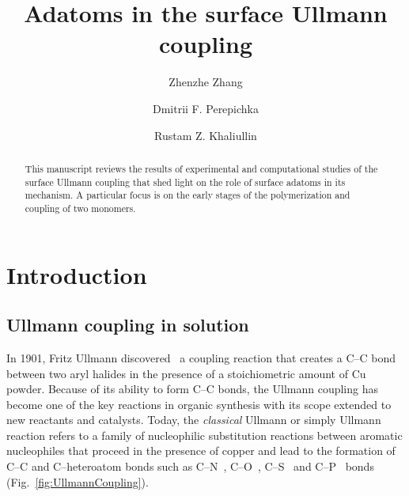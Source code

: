 \documentclass[%
 reprint,
 amsmath,amssymb,
 aps,
prb,
]{revtex4-2}
\begin{document}

\title{Adatoms in the surface Ullmann coupling}%

\author{Zhenzhe Zhang}
\author{Dmitrii F. Perepichka}%
\author{Rustam Z. Khaliullin}
%


\begin{abstract}
This manuscript reviews the results of experimental and computational studies of the surface Ullmann coupling that shed light on the role of surface adatoms in its mechanism. A particular focus is on the early stages of the polymerization and coupling of two monomers.
\end{abstract}

\maketitle


\section{Introduction}

\subsection{Ullmann coupling in solution}

In 1901, Fritz Ullmann discovered~\cite{ullmann_01} a coupling reaction that creates a C--C bond between two aryl halides in the presence of a stoichiometric amount of Cu powder. 
Because of its ability to form C--C bonds, the Ullmann coupling has become one of the key reactions in organic synthesis with its scope extended to new reactants and catalysts. 
Today, the \emph{classical} Ullmann or simply Ullmann reaction refers to a family of nucleophilic substitution reactions between aromatic nucleophiles that proceed in the presence of copper and lead to the formation of C--C and C--heteroatom bonds such as C--N~\cite{ullmann_02, ullmann_03}, C--O~\cite{ullmann_04}, C--S~\cite{ullmann_05} and C--P~\cite{ullmann_21,ullmann_22} bonds (Fig.~\ref{fig:UllmannCoupling}). 
\end{document}

